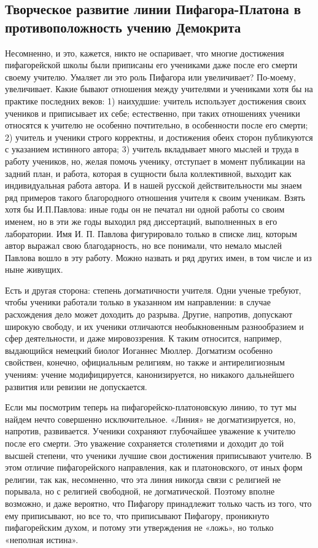 \subsection{Творческое развитие линии Пифагора-Платона в
противоположность учению Демокрита}

Несомненно, и это, кажется, никто не оспаривает, что многие
достижения пифагорейской школы были приписаны его учениками даже после
его смерти своему учителю. Умаляет ли это роль Пифагора или
увеличивает? По-моему, увеличивает. Какие бывают отношения между
учителями и учениками хотя бы на практике последних веков: 1)
наихудшие: учитель использует достижения своих учеников и приписывает
их себе; естественно, при таких отношениях ученики относятся к учителю
не особенно почтительно, в особенности после его смерти; 2) учитель и
ученики строго корректны, и достижения обеих сторон публикуются с
указанием истинного автора; 3) учитель вкладывает много мыслей и труда
в работу учеников, но, желая помочь ученику, отступает в момент
публикации на задний план, и работа, которая в сущности была
коллективной, выходит как индивидуальная работа автора. И в нашей
русской действительности мы знаем ряд примеров такого благородного
отношения учителя к своим ученикам. Взять хотя бы И.П.Павлова: иные
годы он не печатал ни одной работы со своим именем, но в эти же годы
выходил ряд диссертаций, выполненных в его лаборатории. Имя И. П.
Павлова фигурировало только в списке лиц, которым автор выражал свою
благодарность, но все понимали, что немало мыслей Павлова вошло в эту
работу. Можно назвать и ряд других имен, в том числе и из ныне
живущих.

Есть и другая сторона: степень догматичности учителя. Одни ученые
требуют, чтобы ученики работали только в указанном им направлении: в
случае расхождения дело может доходить до разрыва. Другие, напротив,
допускают широкую свободу, и их ученики отличаются необыкновенным
разнообразием и сфер деятельности, и даже мировоззрения. К таким
относится, например, выдающийся немецкий биолог Иоганнес Мюллер.
Догматизм особенно свойствен, конечно, официальным религиям, но также
и антирелигиозным учениям: учение модифицируется, канонизируется, но
никакого дальнейшего развития или ревизии не допускается.

Если мы посмотрим теперь на пифагорейско-платоновскую линию, то тут мы
найдем нечто совершенно исключительное. «Линия» не догматизируется,
но, напротив, развивается. Ученики сохраняют глубочайшее уважение к
учителю после его смерти. Это уважение сохраняется столетиями и
доходит до той высшей степени, что ученики лучшие свои достижения
приписывают учителю. В этом отличие пифагорейского направления, как и
платоновского, от иных форм религии, так как, несомненно, что эта
линия никогда связи с религией не порывала, но с религией свободной,
не догматической. Поэтому вполне возможно, и даже вероятно, что
Пифагору принадлежит только часть из того, что ему приписывают, но все
то, что приписывают Пифагору, проникнуто пифагорейским духом, и потому
эти утверждения не «ложь», но только «неполная истина».

